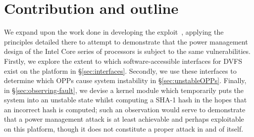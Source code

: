 \section{Contribution and outline}

We expand upon the work done in developing the \clkscrew{} exploit~\cite{clkscrew},
applying the principles detailed there to attempt to demonstrate that the
power management design of the Intel Core series of processors is subject to the
same vulnerabilities.
Firstly, we explore the extent to which software-accessible interfaces for DVFS
exist on the platform in §\ref{sec:interfaces}. Secondly, we use these
interfaces to determine which OPPs cause system instability in §\ref{sec:unstableOPPs}.
Finally, in §\ref{sec:observing-fault}, we devise a kernel module which temporarily
puts the system into an unstable state whilst computing a SHA-1 hash in the
hopes that an incorrect hash is computed; such an observation would serve to
demonstrate that a power management attack is at least achievable and perhaps
exploitable on this platform, though it does not constitute a proper attack in
and of itself.
